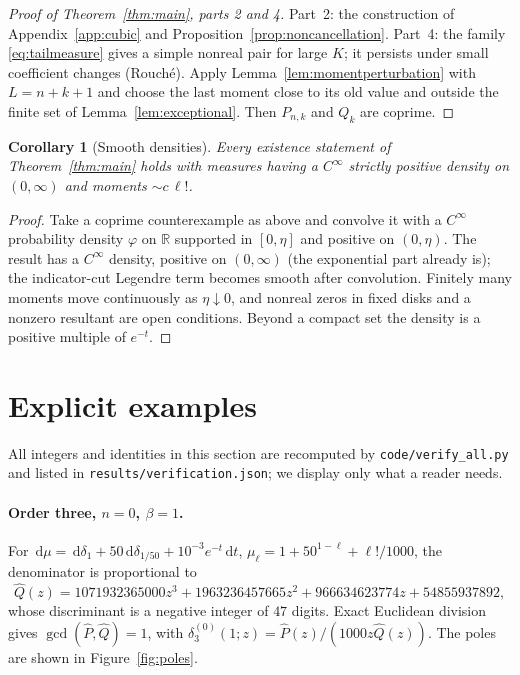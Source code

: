 \documentclass[11pt,a4paper]{article}
\newtheorem{corollary}[theorem]{Corollary}
\theoremstyle{definition}
\theoremstyle{remark}
\newcommand{\dd}{\,\mathrm{d}}
\begin{document}
\begin{proof}[Proof of Theorem~\ref{thm:main}, parts 2 and 4]
Part~2: the construction of Appendix~\ref{app:cubic} and
Proposition~\ref{prop:noncancellation}. Part~4: the family
\eqref{eq:tailmeasure} gives a simple nonreal pair for large $K$; it
persists under small coefficient changes (Rouché). Apply
Lemma~\ref{lem:momentperturbation} with $L=n+k+1$ and choose the last moment
close to its old value and outside the finite set of
Lemma~\ref{lem:exceptional}. Then $P_{n,k}$ and $Q_k$ are coprime.
\end{proof}

\begin{corollary}[Smooth densities]\label{cor:smooth}
Every existence statement of Theorem~\ref{thm:main} holds with measures
having a $C^\infty$ strictly positive density on $(0,\infty)$ and moments
$\sim c\,\ell!$.
\end{corollary}
\begin{proof}
Take a coprime counterexample as above and convolve it with a $C^\infty$
probability density $\varphi$ on $\mathbb R$ supported in $[0,\eta]$ and
positive on $(0,\eta)$. The result has a $C^\infty$ density, positive on
$(0,\infty)$ (the exponential part already is); the indicator-cut Legendre
term becomes smooth after convolution. Finitely many moments move
continuously as $\eta\downarrow0$, and nonreal zeros in fixed disks and a
nonzero resultant are open conditions. Beyond a compact set the density
is a positive multiple of $e^{-t}$.
\end{proof}

\section{Explicit examples}\label{sec:examples}

All integers and identities in this section are recomputed by
\texttt{code/verify\_all.py} and listed in \texttt{results/verification.json};
we display only what a reader needs.

\paragraph{Order three, $n=0$, $\beta=1$.}
For $\dd\mu=\dd\delta_1+50\dd\delta_{1/50}+10^{-3}e^{-t}\dd t$,
$\mu_\ell=1+50^{1-\ell}+\ell!/1000$, the denominator is proportional to
\[
 \widehat Q(z)=1071932365000z^3+1963236457665z^2+966634623774z+54855937892,
\]
whose discriminant is a negative integer of $47$ digits. Exact Euclidean
division gives $\gcd(\widehat P,\widehat Q)=1$, with
$\delta_3^{(0)}(1;z)=\widehat P(z)/(1000z\widehat Q(z))$. The poles are
shown in Figure~\ref{fig:poles}.
\end{document}
